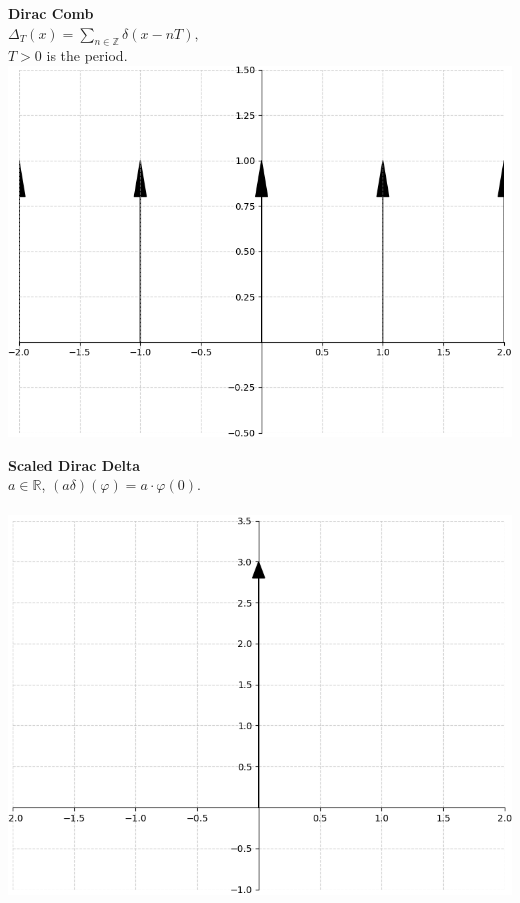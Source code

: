\documentclass[8pt]{article}
\begin{document}
\begin{minipage}[t]{0.24\textwidth}
    \textbf{Dirac Comb}\\
    $\Delta_T(x) = \sum_{n \in \mathbb{Z}} \delta(x - nT),$\\
    $T > 0$ is the period.\smallskip \\
    \includegraphics[width=1.05\linewidth]{images/dirac_comb.png}
\end{minipage}
\hfill
\begin{minipage}[t]{0.24\textwidth}
    \textbf{Scaled Dirac Delta}\\
    $a \in \mathbb{R}$, $(a\delta)(\varphi) = a \cdot \varphi(0).$ \smallskip \\\\
    \includegraphics[width=1.05\linewidth]{images/scaled_dirac_delta.png}
\end{minipage}
\end{document}
